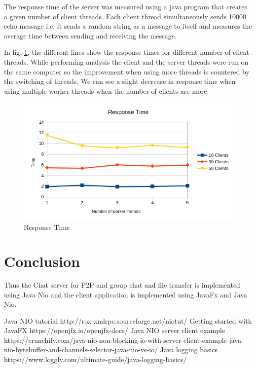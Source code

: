 \documentclass{article}
\begin{document}
The response time of the server was measured using a java program that creates a given number of client threads. Each client thread simultaneously sends 10000 echo message i.e. it sends a random string as a message to itself and measures the average time between sending and receiving the message.

In fig. \ref{fig:responsetime}, the different lines show the response times for different number of client threads. 
While performing analysis the client and the server threads were run on the same computer so the improvement when using more threads is countered by the switching of threads.
We can see a slight decrease in response time when using multiple worker threads when the number of clients are more.

\begin{figure}
	\includegraphics[width=\linewidth]{responsetime.png}
	\caption{Response Time}
	\label{fig:responsetime}
\end{figure}

\section{Conclusion}

Thus the Chat server for P2P and group chat and file transfer is implemented using Java Nio and the client application is implemented using JavaFx and Java Nio.

\begin{thebibliography}{1}

	 Java NIO tutorial {http://rox-xmlrpc.sourceforge.net/niotut/}
	 Getting started with JavaFX {https://openjfx.io/openjfx-docs/}
	 Java NIO server client example {https://crunchify.com/java-nio-non-blocking-io-with-server-client-example-java-nio-bytebuffer-and-channels-selector-java-nio-vs-io/}
	 Java logging basics {https://www.loggly.com/ultimate-guide/java-logging-basics/}

\end{thebibliography}
\end{document}

